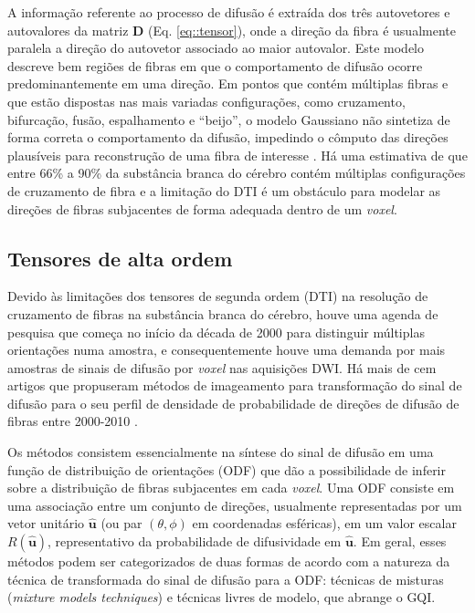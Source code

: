 \documentclass[
    12pt,                %
    oneside,            %
    a4paper,            %
    english,            %
    french,                %
    spanish,            %
    brazil                %
    ]{abntex2}
\begin{document}
A informação referente ao processo de difusão é extraída dos três autovetores e autovalores da matriz $\mathbf{D}$ (Eq. \ref{eq::tensor}), onde a direção da fibra é usualmente paralela a direção do autovetor associado ao maior autovalor.
Este modelo descreve bem regiões de fibras em que o comportamento de difusão ocorre predominantemente em uma direção. Em pontos que contém múltiplas fibras e que estão dispostas nas mais variadas configurações, como cruzamento, bifurcação, fusão, espalhamento e ``beijo'', o modelo Gaussiano não sintetiza de forma correta o comportamento da difusão, impedindo o cômputo das direções plausíveis para reconstrução de uma fibra de interesse \cite{fillard2011, daducci2014}. Há uma estimativa de que entre 66\% a 90\% da substância branca do cérebro contém múltiplas configurações de cruzamento de fibra \cite{descoteaux2015} e a limitação do DTI é um obstáculo para modelar as direções de fibras subjacentes de forma adequada dentro de um \textit{voxel}.

\subsection{Tensores de alta ordem}
\label{metodos_de_alta_ordem}

Devido às limitações dos tensores de segunda ordem (DTI) na resolução de cruzamento de fibras na substância branca do cérebro, houve uma agenda de pesquisa que começa no início da década de 2000 para distinguir múltiplas orientações numa amostra, e consequentemente houve uma demanda por mais amostras de sinais de difusão por \textit{voxel} nas aquisições DWI. %
Há mais de cem artigos que propuseram métodos de imageamento para transformação do sinal de difusão para o seu perfil de densidade de probabilidade de direções de difusão de fibras entre 2000-2010 \cite{descoteaux2015}.

Os métodos consistem essencialmente na síntese do sinal de difusão em uma função de distribuição de orientações (ODF) que dão a possibilidade de inferir sobre a distribuição de fibras subjacentes em cada \textit{voxel}. Uma ODF consiste em uma associação entre um conjunto de direções, usualmente representadas por um vetor unitário $\mathbf{\hat{u}}$ (ou par $(\theta, \phi)$ em coordenadas esféricas), em um valor escalar $R(\mathbf{\hat{u}})$, representativo da probabilidade de difusividade em $\mathbf{\hat{u}}$. Em geral, esses métodos podem ser categorizados de duas formas de acordo com a natureza da técnica de transformada do sinal de difusão para a ODF: técnicas de misturas (\textit{mixture models techniques}) e técnicas livres de modelo, que abrange o GQI.
\end{document}
